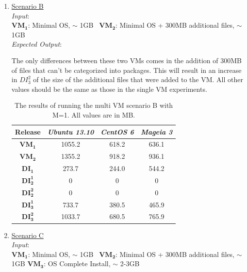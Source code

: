 \begin{enumerate}
\item \underline{Scenario B}\\
\textit{Input}:\\
$\boldsymbol{VM_1}$: Minimal OS, $\sim$ 1GB \textemdash\ $\boldsymbol{VM_2}$: Minimal OS + 300MB additional files, $\sim$ 1GB\\

\textit{Expected Output}:


The only differences between these two VMs comes in the addition of 300MB of files that can't be categorized into packages. This will result in an increase in $DI_3^2$ of the size of the additional files that were added to the VM. All other values should be the same as those in the single VM experiments.

\begin{table}[h]
\centering

    \begin{tabular}{| c | c | c | c|}
    \hline
    \bfseries Release & \itshape Ubuntu 13.10 & \itshape CentOS 6 & \itshape Mageia 3\\ \hline
\bfseries $\boldsymbol{VM_1}$ & 1055.2 & 618.2 & 636.1\\ \hline
\bfseries $\boldsymbol{VM_2}$ & 1355.2 & 918.2 & 936.1\\ \hline \hline
    \bfseries $\boldsymbol{DI_1}$ & 273.7 & 244.0 & 544.2\\ \hline
    \bfseries $\boldsymbol{DI_2^1}$ & 0 & 0 & 0\\ \hline 
\bfseries $\boldsymbol{DI_2^2}$ & 0 & 0 & 0\\ \hline 
\bfseries $\boldsymbol{DI_3^1}$  & 733.7 & 380.5 & 465.9\\ \hline 
\bfseries $\boldsymbol{DI_3^2}$ & 1033.7 & 680.5 & 765.9\\ \hline 
    \end{tabular}
\caption{The results of running the multi VM scenario B with M=1. All values are in MB.}
\label{table:multiscenariob}
\end{table}


\item \underline{Scenario C}\\
\textit{Input}:\\
$\boldsymbol{VM_1}$: Minimal OS, $\sim$ 1GB \textemdash\ $\boldsymbol{VM_2}$: Minimal OS + 300MB additional files, $\sim$ 1GB \textemdash $\boldsymbol{VM_3}$: OS Complete Install, $\sim$ 2-3GB\\


\end{enumerate}
